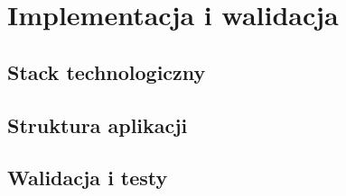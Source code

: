 \section{Implementacja i walidacja}
\label{sec:implementacja}

\subsection{Stack technologiczny}

\subsection{Struktura aplikacji}

\subsection{Walidacja i testy}
